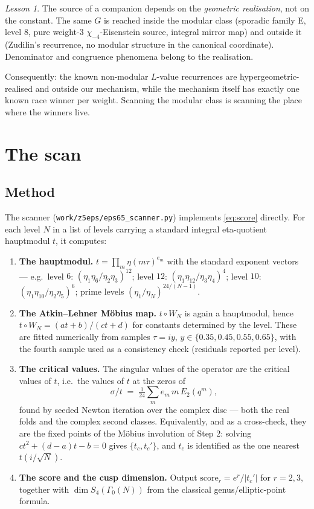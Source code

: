 \documentclass[11pt,reqno]{amsart}
\theoremstyle{plain}
\theoremstyle{definition}
\theoremstyle{remark}
\newtheorem{lesson}[theorem]{Lesson}
\newcommand{\tc}{t_c}
\newcommand{\tcp}{t_c'}
\newcommand{\Ga}{\Gamma_0}
\begin{document}
\begin{lesson}
The source of a companion depends on the \emph{geometric realisation},
not on the constant. The same $G$ is reached inside the modular class
(sporadic family E, level $8$, pure weight-$3$ $\chi_{-4}$-Eisenstein
source, integral mirror map) and outside it (Zudilin's recurrence, no
modular structure in the canonical coordinate). Denominator and
congruence phenomena belong to the realisation.
\end{lesson}

Consequently: the known non-modular $L$-value recurrences are
hypergeometric-realised and outside our mechanism, while the mechanism
itself has exactly one known race winner per weight. Scanning the modular
class is scanning the place where the winners live.

\section{The scan}
\label{sec:scan}

\subsection{Method}

The scanner (\texttt{work/z5eps/eps65\_scanner.py}) implements
\eqref{eq:score} directly. For each level $N$ in a list of levels
carrying a standard integral eta-quotient hauptmodul $t$, it computes:

\begin{enumerate}[label=\textbf{Step \arabic*.},leftmargin=3.4em]
\item \textbf{The hauptmodul.} $t=\prod_m\eta(m\tau)^{e_m}$ with the
  standard exponent vectors --- e.g.\ level $6$:
  $(\eta_1\eta_6/\eta_2\eta_3)^{12}$; level $12$:
  $(\eta_1\eta_{12}/\eta_3\eta_4)^{4}$; level $10$:
  $(\eta_1\eta_{10}/\eta_2\eta_5)^{6}$; prime levels
  $(\eta_1/\eta_N)^{24/(N-1)}$.
\item \textbf{The Atkin--Lehner M\"obius map.} $t\circ W_N$ is again a
  hauptmodul, hence $t\circ W_N=(at+b)/(ct+d)$ for constants determined
  by the level. These are fitted numerically from samples
  $\tau=iy$, $y\in\{0.35,0.45,0.55,0.65\}$, with the fourth sample used
  as a consistency check (residuals reported per level).
\item \textbf{The critical values.} The singular values of the operator
  are the critical values of $t$, i.e.\ the values of $t$ at the zeros of
  \[
    \sigma/t \;=\; \tfrac{1}{24}\sum_m e_m\,m\,E_2(q^m),
  \]
  found by seeded Newton iteration over the complex disc --- both the real
  folds and the complex second classes. Equivalently, and as a
  cross-check, they are the fixed points of the M\"obius involution of
  Step 2: solving $ct^2+(d-a)t-b=0$ gives $\{\tc,\tcp\}$, and $\tc$ is
  identified as the one nearest $t(i/\sqrt N)$.
\item \textbf{The score and the cusp dimension.} Output
  $\mathrm{score}_r=e^r/|\tcp|$ for $r=2,3$, together with
  $\dim S_4(\Ga(N))$ from the classical genus/elliptic-point formula.
\end{enumerate}
\end{document}
